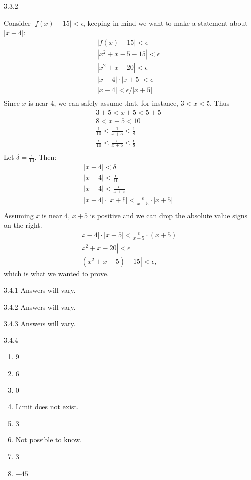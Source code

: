 \begin{Answer}{3.3.2}
\begin{enumerate}
{Consider $|f(x)-15|<\epsilon$, keeping in  mind we want to make a statement about $|x-4|$:
\begin{gather*}
|f(x) -15 | < \epsilon \\
|x^2+x-5 -15 |<\epsilon \\
| x^2+x-20 | < \epsilon \\
| x-4 |\cdot|x+5| < \epsilon \\
| x-4 | < \epsilon/|x+5| \\
\end{gather*}
Since $x$ is near 4, we can safely assume that, for instance, $3<x<5$. Thus
\begin{gather*}
3+5<x+5<5+5 \\
8 < x+5 < 10 \\
\frac{1}{10} < \frac{1}{x+5} < \frac{1}{8} \\
\frac{\epsilon}{10} < \frac{\epsilon}{x+5} < \frac{\epsilon}{8} \\
\end{gather*}
Let $\delta =\frac{\epsilon}{10}$. Then:
\begin{gather*}
|x-4|<\delta \\
|x-4| < \frac{\epsilon}{10}\\
|x-4| < \frac{\epsilon}{x+5}\\
|x-4|\cdot|x+5| < \frac{\epsilon}{x+5}\cdot|x+5|\\
\end{gather*}
Assuming $x$ is near 4, $x+5$ is positive and we can drop the absolute value signs on the right.
\begin{gather*}
|x-4|\cdot|x+5| < \frac{\epsilon}{x+5}\cdot(x+5)\\
|x^2+x-20| < \epsilon\\
|(x^2+x-5) -15| < \epsilon,
\end{gather*}
which is what we wanted to prove.
}

\end{enumerate}
\end{Answer}
\begin{Answer}{3.4.1}
{Answers will vary.
}
\end{Answer}
\begin{Answer}{3.4.2}
{Answers will vary.
}
\end{Answer}
\begin{Answer}{3.4.3}
{Answers will vary.
}
\end{Answer}
\begin{Answer}{3.4.4}
\begin{enumerate}
\item
{9}
\item
{6}
\item
{0}
\item
{Limit does not exist.}
\item
{3}
\item
{Not possible to know.}
\item
{3}
\item
{$-45$}
\end{enumerate}
\end{Answer}
